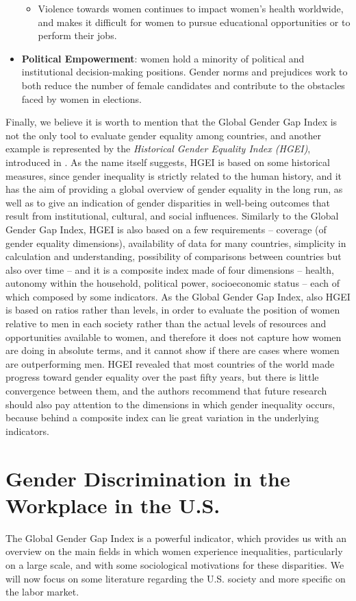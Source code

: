 \begin{itemize}
\begin{itemize}
\item Violence towards women continues to impact women's health worldwide, and makes it difficult for women to pursue educational opportunities or to perform their jobs.
\end{itemize}
\item \textbf{Political Empowerment}: women hold a minority of political and institutional decision-making positions. Gender norms and prejudices work to both reduce the number of female candidates and contribute to the obstacles faced by women in elections.
\end{itemize}

Finally, we believe it is worth to mention that the Global Gender Gap Index is not the only tool to evaluate gender equality among countries, and another example is represented by the \textit{Historical Gender Equality Index (HGEI)}, introduced in \cite{dilli2018introducing}. As the name itself suggests, HGEI is based on some historical measures, since gender inequality is strictly related to the human history, and it has the aim of providing a global overview of gender equality in the long run, as well as to give an indication of gender disparities in well-being outcomes that result from institutional, cultural, and social influences.
Similarly to the Global Gender Gap Index, HGEI is also based on a few requirements -- coverage (of gender equality dimensions), availability of data for many countries, simplicity in calculation and understanding, possibility of comparisons between countries but also over time -- and it is a composite index made of four dimensions -- health, autonomy within the household, political power, socioeconomic status -- each of which composed by some indicators.
As the Global Gender Gap Index, also HGEI is based on ratios rather than levels, in order to evaluate the position of women relative to men in each society rather than the actual levels of resources and opportunities available to women, and therefore it does not capture how women are doing in absolute terms, and it cannot show if there are cases where women are outperforming men.
HGEI revealed that most countries of the world made progress toward gender equality over the past fifty years, but there is little convergence between them, and the authors recommend that future research should also pay attention to the dimensions in which gender inequality occurs, because behind a composite index can lie great variation in the underlying indicators.


\section{Gender Discrimination in the Workplace in the U.S.}
The Global Gender Gap Index is a powerful indicator, which provides us with an overview on the main fields in which women experience inequalities, particularly on a large scale, and with some sociological motivations for these disparities. We will now focus on some literature regarding the U.S. society and more specific on the labor market.

